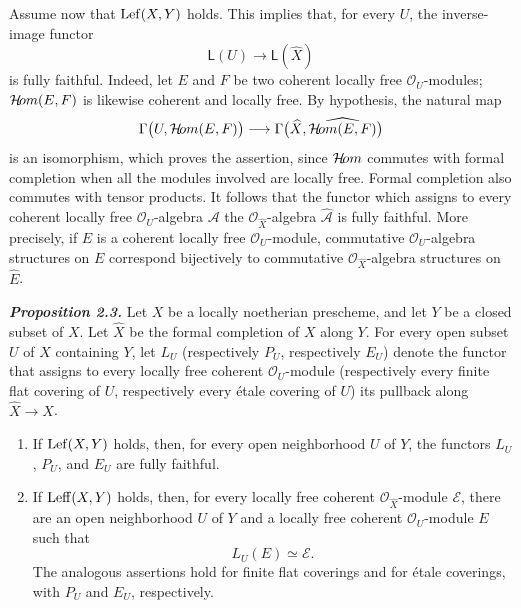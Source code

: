 Assume now that $\operatorname{Lef}(X,Y)$ holds. This implies that, for every $U$, the
inverse-image functor
\[
  \mathsf L(U)\longrightarrow\mathsf L(\widehat X)
\]
is fully faithful. Indeed, let $E$ and $F$ be two coherent locally free
$\mathcal O_U$-modules; $\mathcal H\!om(E,F)$ is likewise coherent and locally free.
By hypothesis, the natural map
\[
  \Gamma\bigl(U,\mathcal H\!om(E,F)\bigr)
  \longrightarrow
  \Gamma\bigl(\widehat X,\widehat{\mathcal H\!om(E,F)}\bigr)
\]
is an isomorphism, which proves the assertion, since $\mathcal H\!om$ commutes with
formal completion when all the modules involved are locally free. Formal
completion also commutes with tensor products. It follows that the functor
which assigns to every coherent locally free $\mathcal O_U$-algebra
$\mathcal A$ the $\mathcal O_{\widehat X}$-algebra $\widehat{\mathcal A}$
is fully faithful. More precisely, if $E$ is a coherent locally free
$\mathcal O_U$-module, commutative $\mathcal O_U$-algebra structures on $E$
correspond bijectively to commutative $\mathcal O_{\widehat X}$-algebra
structures on $\widehat E$.

\medskip
{}\noindent\textbf{\textit{Proposition 2.3.}}
Let $X$ be a locally noetherian prescheme, and let $Y$ be a closed subset of
$X$. Let $\widehat X$ be the formal completion of $X$ along $Y$. For every
open subset $U$ of $X$ containing $Y$, let $L_U$ (respectively $P_U$,
respectively $E_U$) denote the functor that assigns to every locally free
coherent $\mathcal O_U$-module (respectively every finite flat covering of
$U$, respectively every \'{e}tale covering of $U$) its pullback along
$\widehat X\to X$.

\begin{enumerate}[label=(\roman*),leftmargin=2.5em]
\item If $\operatorname{Lef}(X,Y)$ holds, then, for every open neighborhood $U$ of $Y$,
the functors $L_U$, $P_U$, and $E_U$ are fully faithful.

\item If $\operatorname{Leff}(X,Y)$ holds, then, for every locally free coherent
$\mathcal O_{\widehat X}$-module $\mathcal E$, there are an open
neighborhood $U$ of $Y$ and a locally free coherent $\mathcal O_U$-module
$E$ such that
\[
  L_U(E)\simeq\mathcal E.
\]
The analogous assertions hold for finite flat coverings and for \'{e}tale
coverings, with $P_U$ and $E_U$, respectively.
\end{enumerate}

